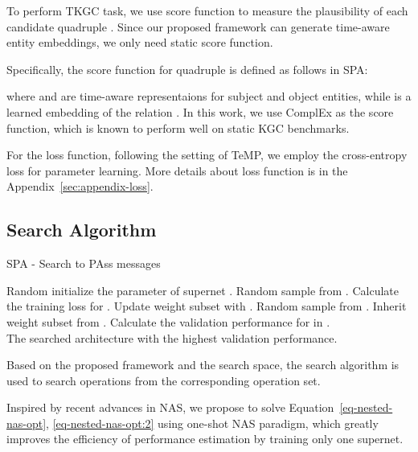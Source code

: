 \documentclass[11pt]{article}
\begin{document}
To perform TKGC task, 
we use score function to measure the plausibility of each candidate quadruple .
Since our proposed framework can generate time-aware entity embeddings,
we only need static score function.

Specifically, 
the score function for quadruple is defined as follows in SPA:

where  and  are time-aware representaions for subject and object entities, while  is a learned embedding of the relation . 
In this work, 
we use ComplEx \citep{trouillon2016complex} as the score function, 
which is known to perform well on static KGC benchmarks.

For the loss function,
following the setting of TeMP,
we employ the cross-entropy loss for parameter learning.
More details about loss function is in the Appendix~\ref{sec:appendix-loss}.

\subsection{Search Algorithm}\label{sec-search-algorithm}
 
\begin{algorithm}[tb]
	\caption{SPA - Search to PAss messages}
	\begin{algorithmic}[1]
		\State Random initialize the parameter of supernet .
		\While {}
		\State Random sample  from .
		\State Calculate the training loss  for .
		\State Update weight subset  with .
		\EndFor
		\EndWhile
		\While {}
		\State Random sample  from .
		\State Inherit weight subset  from .
		\State Calculate the validation performance for  in .
		\EndWhile \\
		\Return The searched architecture with the highest validation performance.
	\end{algorithmic}
	\label{alg-spa}
	\vspace{-2px}
\end{algorithm}

Based on the proposed framework and the search space, 
the search algorithm is used to search operations from the corresponding operation set.

Inspired by recent advances in NAS, 
we propose to solve Equation~\eqref{eq-nested-nas-opt}, \eqref{eq-nested-nas-opt:2} 
using one-shot NAS paradigm, 
which greatly improves the efficiency of performance estimation by training only one supernet.
\end{document}
